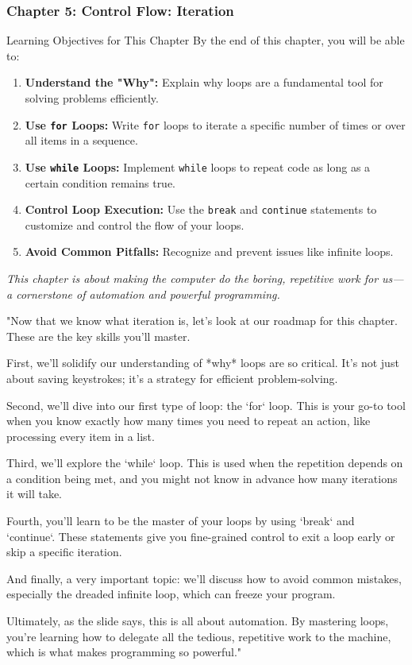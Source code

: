 \documentclass{beamer}
\begin{document}
\begin{frame}[fragile]
    \frametitle{Chapter 5: Control Flow: Iteration}
    
    \begin{block}{Learning Objectives for This Chapter}
        By the end of this chapter, you will be able to:
        \begin{enumerate}
            \item \textbf{Understand the "Why":} Explain why loops are a fundamental tool for solving problems efficiently.
            \item \textbf{Use \texttt{for} Loops:} Write \texttt{for} loops to iterate a specific number of times or over all items in a sequence.
            \item \textbf{Use \texttt{while} Loops:} Implement \texttt{while} loops to repeat code as long as a certain condition remains true.
            \item \textbf{Control Loop Execution:} Use the \texttt{break} and \texttt{continue} statements to customize and control the flow of your loops.
            \item \textbf{Avoid Common Pitfalls:} Recognize and prevent issues like infinite loops.
        \end{enumerate}
    \end{block}
    
    \vfill
    
    \textit{This chapter is about making the computer do the boring, repetitive work for us—a cornerstone of automation and powerful programming.}
    \begin{note}
    "Now that we know what iteration is, let's look at our roadmap for this chapter. These are the key skills you'll master.

    First, we'll solidify our understanding of *why* loops are so critical. It's not just about saving keystrokes; it’s a strategy for efficient problem-solving.

    Second, we'll dive into our first type of loop: the `for` loop. This is your go-to tool when you know exactly how many times you need to repeat an action, like processing every item in a list.

    Third, we'll explore the `while` loop. This is used when the repetition depends on a condition being met, and you might not know in advance how many iterations it will take.

    Fourth, you'll learn to be the master of your loops by using `break` and `continue`. These statements give you fine-grained control to exit a loop early or skip a specific iteration.

    And finally, a very important topic: we'll discuss how to avoid common mistakes, especially the dreaded infinite loop, which can freeze your program.

    Ultimately, as the slide says, this is all about automation. By mastering loops, you're learning how to delegate all the tedious, repetitive work to the machine, which is what makes programming so powerful."
    \end{note}
\end{frame}
\end{document}
